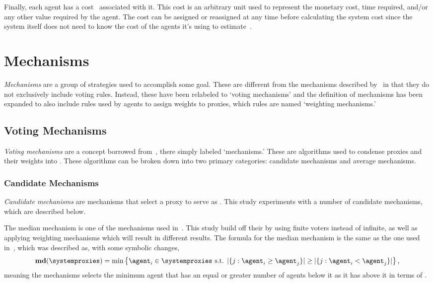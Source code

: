 Finally, each agent has a cost \agentcost\ associated with it.
This cost is an arbitrary unit used to represent the monetary cost, time
required, and/or any other value required by the agent.
The cost can be assigned or reassigned at any time before calculating the
system cost since the system itself does not need to know the cost of the
agents it's using to estimate~\truth.



\section{Mechanisms}\label{sec:mechanisms}
\textit{Mechanisms} are a group of strategies used to accomplish some goal.
These are different from the mechanisms described by~\cite{Cohensius2017} in
that they do not exclusively include voting rules.
Instead, these have been relabeled to `voting mechanisms' and the definition
of mechanisms has been expanded to also include rules used by agents to
assign weights to proxies, which rules are named `weighting mechanisms.'

\subsection{Voting Mechanisms}\label{subsec:voting-mechanisms}
\textit{Voting mechanisms} are a concept borrowed from~\cite{Cohensius2017},
there simply labeled `mechanisms.'
These are algorithms used to condense proxies and their weights into
\systemtruth.
These algorithms can be broken down into two primary categories: candidate
mechanisms and average mechanisms.

\subsubsection{Candidate Mechanisms}\label{subsubsec:candidate-mechanisms}
\textit{Candidate mechanisms} are mechanisms that select a proxy to serve as
\systemtruth.
This study experiments with a number of candidate mechanisms, which are
described below.

The median mechanism is one of the mechanisms used in~\cite{Cohensius2017}.
This study build off their by using finite voters instead of infinite, as
well as applying weighting mechanisms which will result in different results.
The formula for the median mechanism is the same as the one used
in~\cite[para.~2.4]{Cohensius2017}, which was described as, with some
symbolic changes,
\begin{equation*}
    \textbf{md}(\systemproxies) =
    \min\left\{\agent_i \in \systemproxies \text{ s.t. }
    |\{j: \agent_i \geq \agent_j\}| \geq
    |\{j: \agent_i < \agent_j\}|
    \right\}
    \text{,}
\end{equation*}
meaning the mechanisms selects the minimum agent that has an equal or greater
number of agents below it as it has above it in terms of \agenttruth.

